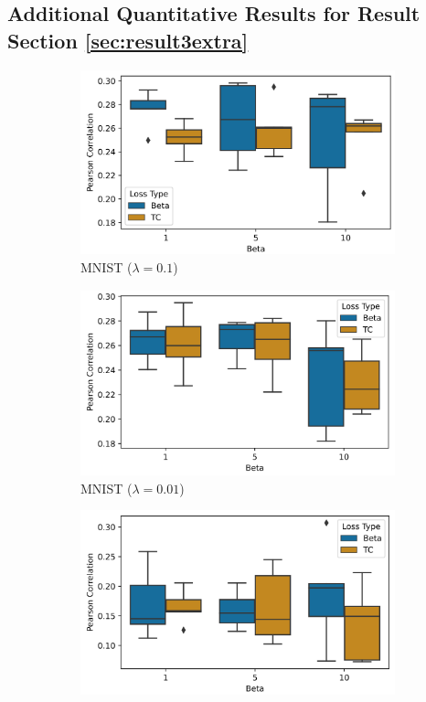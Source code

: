 \subsection{Additional Quantitative Results for Result Section \ref{sec:result3extra}}
\begin{figure}[h]
\centering
\begin{subfigure}[b]{0.32\linewidth}
\includegraphics[width=\textwidth]{images/vae/metric_box_plots_mnist_0_1.PNG}
\caption{MNIST ($\lambda= 0.1$)}\label{fig:metric_box_plots_mnist_0_1}
\end{subfigure}
\begin{subfigure}[b]{0.32\linewidth}
\includegraphics[width=\textwidth]{images/vae/metric_box_plots_mnist_0_01.PNG}
\caption{MNIST ($\lambda= 0.01$)}\label{fig:metric_box_plots_mnist_0_01}
\end{subfigure}
\begin{subfigure}[b]{0.32\linewidth}
\includegraphics[width=\textwidth]{images/vae/metric_box_plots_mnist_0_001.PNG}

\end{subfigure}
\end{figure}

